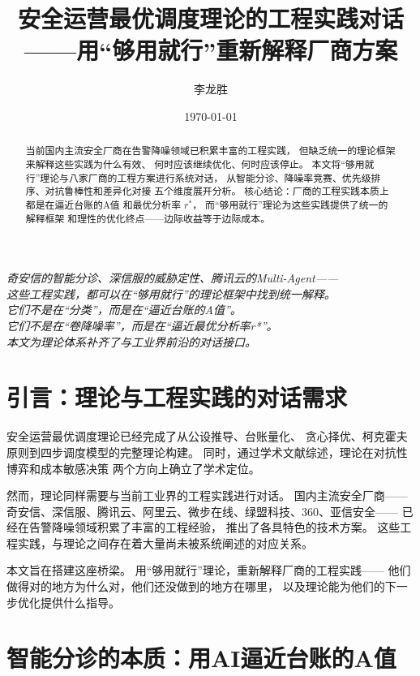 \documentclass[11pt,a4paper]{article}
\title{安全运营最优调度理论的工程实践对话\\
——用“够用就行”重新解释厂商方案}
\author{李龙胜}
\date{\today}
\begin{document}
\maketitle

\begin{center}
\textit{
奇安信的智能分诊、深信服的威胁定性、腾讯云的Multi-Agent——\\
这些工程实践，都可以在“够用就行”的理论框架中找到统一解释。\\
它们不是在“分类”，而是在“逼近台账的A值”。\\
它们不是在“卷降噪率”，而是在“逼近最优分析率r*”。\\
本文为理论体系补齐了与工业界前沿的对话接口。
}
\end{center}

\vspace{5mm}

\begin{abstract}
当前国内主流安全厂商在告警降噪领域已积累丰富的工程实践，
但缺乏统一的理论框架来解释这些实践为什么有效、
何时应该继续优化、何时应该停止。
本文将“够用就行”理论与八家厂商的工程方案进行系统对话，
从智能分诊、降噪率竞赛、优先级排序、对抗鲁棒性和差异化对接
五个维度展开分析。
核心结论：厂商的工程实践本质上都是在逼近台账的A值
和最优分析率 \(r^*\)，
而“够用就行”理论为这些实践提供了统一的解释框架
和理性的优化终点——边际收益等于边际成本。
\end{abstract}

\tableofcontents

\section{引言：理论与工程实践的对话需求}

安全运营最优调度理论已经完成了从公设推导、台账量化、
贪心择优、柯克霍夫原则到四步调度模型的完整理论构建。
同时，通过学术文献综述，理论在对抗性博弈和成本敏感决策
两个方向上确立了学术定位。

然而，理论同样需要与当前工业界的工程实践进行对话。
国内主流安全厂商——
奇安信、深信服、腾讯云、阿里云、微步在线、绿盟科技、360、亚信安全——
已经在告警降噪领域积累了丰富的工程经验，
推出了各具特色的技术方案。
这些工程实践，与理论之间存在着大量尚未被系统阐述的对应关系。

本文旨在搭建这座桥梁。
用“够用就行”理论，重新解释厂商的工程实践——
他们做得对的地方为什么对，他们还没做到的地方在哪里，
以及理论能为他们的下一步优化提供什么指导。

\section{智能分诊的本质：用AI逼近台账的A值}
\end{document}
